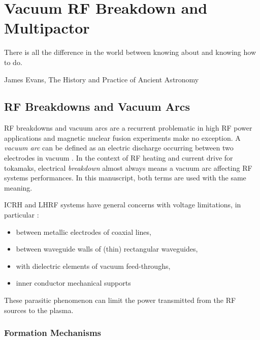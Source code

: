 \setchapterpreamble[u]{\margintoc}
\chapter{Vacuum RF Breakdown and Multipactor}\label{chap:Multipactor}

\epigraph{There is all the difference in the world between knowing about and knowing how to do.}{James Evans, The History and Practice of Ancient Astronomy}


\section[RF Breakdowns]{RF Breakdowns and Vacuum Arcs}
RF breakdowns and vacuum arcs are a recurrent problematic in high RF power applications and magnetic nuclear fusion experiments make no exception. A \textit{vacuum arc} can be defined as an electric discharge occurring between two electrodes in vacuum . In the context of RF heating and current drive for tokamaks, electrical \textit{breakdown} almost always means a vacuum arc affecting RF systems performances. In this manuscript, both terms are used with the same meaning.

ICRH and LHRF systems have general concerns with voltage limitations, in particular :
\begin{itemize}
	\item between metallic electrodes of coaxial lines,
	\item between waveguide walls of (thin) rectangular waveguides,
	\item with dielectric elements of vacuum feed-throughs,
	\item inner conductor mechanical supports
\end{itemize}
These parasitic phenomenon can limit the power transmitted from the RF sources to the plasma.

\subsection{Formation Mechanisms}

